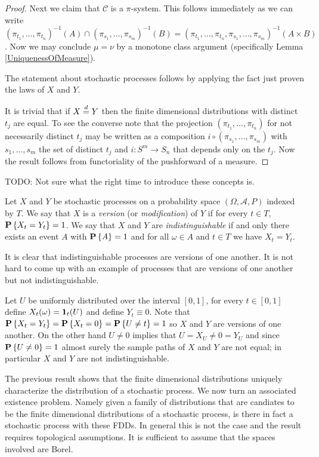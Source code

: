 \begin{proof}
Next we claim that $\mathcal{C}$ is a $\pi$-system.  This follows
immediately as we can write $(\pi_{t_1},\dotsc, \pi_{t_n})^{-1}(A)
\cap (\pi_{s_1},\dotsc, \pi_{s_m})^{-1}(B) = (\pi_{t_1},\dotsc,
\pi_{t_n}, \pi_{s_1},\dotsc, \pi_{s_m})^{-1}(A \times B)$.  Now we may
conclude $\mu = \nu$
by a monotone class argument (specifically Lemma \ref{UniquenessOfMeasure}).

The statement about stochastic processes follows by applying the fact just proven the laws
of $X$ and $Y$.

It is trivial that if $X \overset{d}= Y$ then the finite dimensional
distributions with distinct $t_j$ are equal.  To see the converse note
that the projection $(\pi_{t_1},\dotsc,  \pi_{t_n})$ for not necessarily distinct $t_j$ may be written
as a composition $i \circ (\pi_{s_1}, \dotsc, \pi_{s_m})$ with $s_1,
\dotsc, s_m$ the set of distinct $t_j$ and $i : S^m \to S_n$ that
depends only on the $t_j$.  Now the result follows from functoriality
of the pushforward of a measure.
\end{proof}

TODO: Not sure what the right time to introduce these concepts is.
\begin{defn}Let $X$ and $Y$ be stochastic processes on a probability space $(\Omega, \mathcal{A}, P)$ indexed by $T$.
  We say that $X$ is a \emph{version} (or \emph{modification}) of $Y$  if 
for every $t \in T$, $\textbf{P}\left \{X_t = Y_t \right \} = 1$.  We say that $X$ and $Y$ are \emph{indistinguishable} if and only there exists
an event $A$ with $\textbf{P}\left \{A \right \} = 1$ and for all $\omega \in A$ and $t \in T$ we have $X_t = Y_t$.
\end{defn}

It is clear that indistinguishable processes are versions of one another.  It is not hard to come up with an example of processes that are
versions of one another but not indistinguishable.
\begin{examp}Let $U$ be uniformly distributed over the interval $[0,1]$, for every $t \in [0,1]$ define $X_t(\omega) = \textbf{1}_{t}(U)$ and define $Y_t \equiv 0$.  Note that $\textbf{P}\left \{X_t = Y_t \right \} = \textbf{P}\left \{X_t = 0 \right \} = \textbf{P}\left \{U \neq t \right \} =1$ so $X$ and $Y$ are versions of one another.    On the other hand 
$U \neq 0$ implies that $U = X_U \neq 0 = Y_U$ and since $\textbf{P}\left \{U \neq 0 \right \}=1$ almost surely the sample paths of $X$ and $Y$ are not equal; in particular $X$ and $Y$ are not indistinguishable.
\end{examp}

The previous result shows that the finite dimensional distributions
uniquely characterize the distribution of a stochastic process.  We
now turn an associated existence problem.  Namely given a family of
distributions that are candiates to be the finite dimensional
distributions of a stochastic process, is there in fact a stochastic
process with these FDDs.  In general this is not the case and the
result requires topological assumptions.  It is sufficient to assume
that the spaces involved are Borel.

